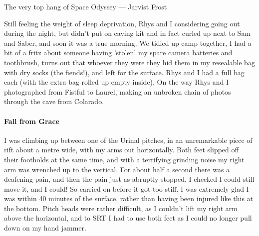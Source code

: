 \begin{marginfigure}
\checkoddpage \ifoddpage \forcerectofloat \else \forceversofloat \fi
\centering
{}
\caption{The very top hang of Space Odyssey  --- Jarvist Frost}
\label{SpaceOdyssey}
\end{marginfigure}


Still feeling the weight of sleep deprivation, Rhys and I considering going out during the night, but didn't put on caving kit and in fact curled up next to Sam and Saber, and soon it was a true morning. We tidied up camp together, I had a bit of a fritz about someone having 'stolen' my spare camera batteries and toothbrush, turns out that whoever they were they hid them in my resealable bag with dry socks (the fiends!), and left for the surface. Rhys and I had a full bag each (with the extra bag rolled up empty inside). On the way Rhys and I photographed from Fistful to Laurel, making an unbroken chain of photos through the cave from Colarado.


\paragraph{Fall from Grace}
I was climbing up between one of the Urinal pitches, in an unremarkable piece of rift about a metre wide, with my arms out horizontally. Both feet slipped off their footholds at the same time, and with a terrifying grinding noise my right arm was wrenched up to the vertical. For about half a second there was a deafening pain, and then the pain just as abruptly stopped. I checked I could still move it, and I could! So carried on before it got too stiff. I was extremely glad I was within 40 minutes of the surface, rather than having been injured like this at the bottom. Pitch heads were rather difficult, as I couldn't lift my right arm above the horizontal, and to SRT I had to use both feet as I could no longer pull down on my hand jammer.

